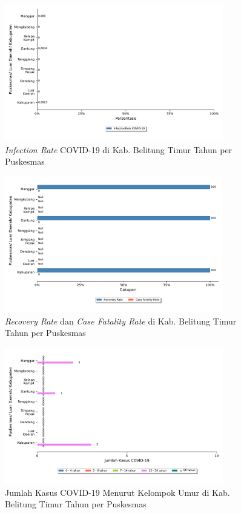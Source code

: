 \begin{figure}[H]
	\centering
	\includegraphics[width=0.85\textwidth]{bab_06/bab_06_17b_infectionRateCovid}
	\caption{\emph{Infection Rate} COVID-19 di Kab. Belitung Timur Tahun \tP per Puskesmas}
	\label{fig:IR-COVID}
\end{figure}

\begin{figure}[H]
	\centering
	\includegraphics[width=0.85\textwidth]{bab_06/bab_06_17c_kasusCovidKesembuhan}
	\caption{\emph{Recovery Rate} dan \emph{Case Fatality Rate} di Kab. Belitung Timur Tahun \tP per Puskesmas}
	\label{fig:RR-COVID}
\end{figure}

\begin{figure}[H]
	\centering
	\includegraphics[width=0.85\textwidth]{bab_06/bab_06_17d_kasusCovidPerUmur}
	\caption{Jumlah Kasus COVID-19 Menurut Kelompok Umur di Kab. Belitung Timur Tahun \tP per Puskesmas}
	\label{fig:COVID-per-umur}
\end{figure}


